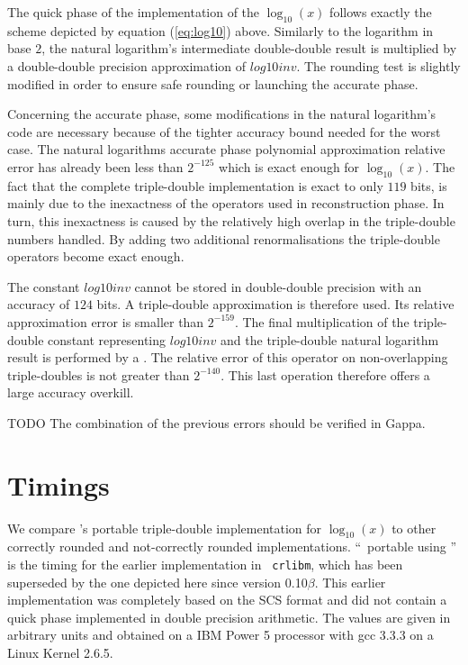 The quick phase of the implementation of the $\log_{10}\left( x
\right)$ follows exactly the scheme depicted by equation
(\ref{eq:log10}) above. Similarly to the logarithm in base
$2$, the natural logarithm's intermediate double-double result is
multiplied by a double-double precision approximation of
$\mathit{log10inv}$. The rounding test is slightly modified in order
to ensure safe rounding or launching the accurate phase.

Concerning the accurate phase, some modifications in the natural
logarithm's code are necessary because of the tighter accuracy bound
needed for the worst case. The natural logarithms accurate phase
polynomial approximation relative error has already been less than
$2^{-125}$ which is exact enough for $\log_{10}\left( x
\right)$. The fact that the complete triple-double implementation is
exact to only $119$ bits, is mainly due to the inexactness of the
operators used in reconstruction phase. In turn, this inexactness is
caused by the relatively high overlap in the triple-double numbers
handled. By adding two additional renormalisations the triple-double
operators become exact enough.

The constant $\mathit{log10inv}$ cannot be stored in double-double
precision with an accuracy of $124$ bits. A triple-double
approximation is therefore used. Its relative approximation error is
smaller than $2^{-159}$. The final multiplication of the triple-double
constant representing $\mathit{log10inv}$ and the triple-double
natural logarithm result is performed by a \MulTT. The relative error
of this operator on non-overlapping triple-doubles is not greater than
$2^{-140}$. This last operation therefore offers a large accuracy
overkill.

TODO The combination of the previous errors should be verified in Gappa.


\section{Timings}\label{subsec:timingslog10}

We compare \crlibm's portable triple-double implementation
for $\log_{10}\left( x \right)$ to other correctly rounded and
not-correctly rounded implementations.  ``\crlibm\ portable using
\scslib'' is the timing for the earlier implementation in {\tt
  crlibm}, which has been superseded by the one depicted here since
version 0.10$\beta$. This earlier implementation was completely based
on the SCS format and did not contain a quick phase implemented in
double precision arithmetic. The values are given in arbitrary units
and obtained on a IBM Power 5 processor with gcc 3.3.3 on a Linux
Kernel 2.6.5.
 
